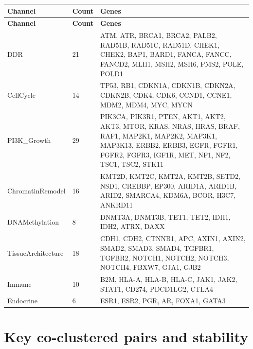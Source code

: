 \documentclass[11pt]{article}
\theoremstyle{definition}
\begin{document}
\begin{longtable}{p{3cm} p{1cm} p{10cm}}
\toprule
\textbf{Channel} & \textbf{Count} & \textbf{Genes} \\
\midrule
\endfirsthead
\toprule
\textbf{Channel} & \textbf{Count} & \textbf{Genes} \\
\midrule
\endhead
DDR & 21 & ATM, ATR, BRCA1, BRCA2, PALB2, RAD51B, RAD51C, RAD51D, CHEK1, CHEK2, BAP1, BARD1, FANCA, FANCC, FANCD2, MLH1, MSH2, MSH6, PMS2, POLE, POLD1 \\
\midrule
CellCycle & 14 & TP53, RB1, CDKN1A, CDKN1B, CDKN2A, CDKN2B, CDK4, CDK6, CCND1, CCNE1, MDM2, MDM4, MYC, MYCN \\
\midrule
PI3K\_Growth & 29 & PIK3CA, PIK3R1, PTEN, AKT1, AKT2, AKT3, MTOR, KRAS, NRAS, HRAS, BRAF, RAF1, MAP2K1, MAP2K2, MAP3K1, MAP3K13, ERBB2, ERBB3, EGFR, FGFR1, FGFR2, FGFR3, IGF1R, MET, NF1, NF2, TSC1, TSC2, STK11 \\
\midrule
ChromatinRemodel & 16 & KMT2D, KMT2C, KMT2A, KMT2B, SETD2, NSD1, CREBBP, EP300, ARID1A, ARID1B, ARID2, SMARCA4, KDM6A, BCOR, H3C7, ANKRD11 \\
\midrule
DNAMethylation & 8 & DNMT3A, DNMT3B, TET1, TET2, IDH1, IDH2, ATRX, DAXX \\
\midrule
TissueArchitecture & 18 & CDH1, CDH2, CTNNB1, APC, AXIN1, AXIN2, SMAD2, SMAD3, SMAD4, TGFBR1, TGFBR2, NOTCH1, NOTCH2, NOTCH3, NOTCH4, FBXW7, GJA1, GJB2 \\
\midrule
Immune & 10 & B2M, HLA-A, HLA-B, HLA-C, JAK1, JAK2, STAT1, CD274, PDCD1LG2, CTLA4 \\
\midrule
Endocrine & 6 & ESR1, ESR2, PGR, AR, FOXA1, GATA3 \\
\bottomrule
\end{longtable}

\section{Key co-clustered pairs and stability}
\end{document}
